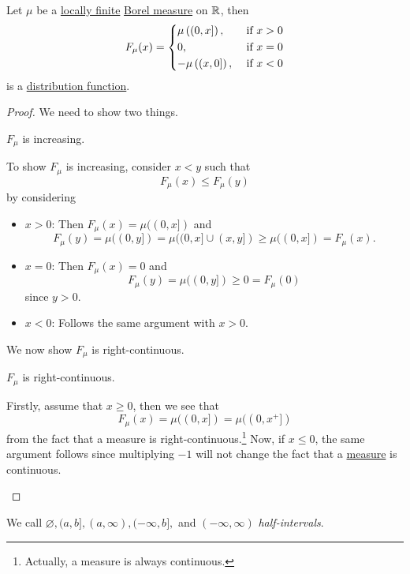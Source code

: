 \begin{lemma}
	Let \(\mu \) be a \hyperref[def:locally-finite]{locally finite} \hyperref[def:Borel-measure]{Borel measure} on
	\(\mathbb{\MakeUppercase{R}} \), then
	\[
		F_{\mu }(x) = \begin{dcases}
			\mu \left((0, x]\right),  & \text{ if } x > 0 \\
			0,                        & \text{ if } x = 0 \\
			-\mu \left((x, 0]\right), & \text{ if } x < 0
		\end{dcases}
	\]
	is a \hyperref[def:distribution-function]{distribution function}.
\end{lemma}
\begin{proof}
	We need to show two things.
	\begin{claim}
		\(F_\mu\) is increasing.
	\end{claim}
	\begin{explanation}
		To show \(F_\mu\) is increasing, consider \(x<y\) such that
		\[
			F_\mu (x) \leq F_\mu (y)
		\]
		by considering
		\begin{itemize}
			\item \(x>0\): Then \(F_\mu (x) = \mu ((0, x])\) and
			      \[
				      F_\mu (y) = \mu ((0, y]) = \mu ((0, x]\cup (x, y]) \geq \mu ((0, x]) = F_\mu (x).
			      \]
			\item \(x=0\): Then \(F_\mu (x) = 0\) and
			      \[
				      F_\mu (y) = \mu ((0, y])\geq 0 = F_\mu (0)
			      \]
			      since \(y>0\).
			\item \(x<0\): Follows the same argument with \(x>0\).
		\end{itemize}
	\end{explanation}

	We now show \(F_\mu \) is right-continuous.
	\begin{claim}
		\(F_\mu \) is right-continuous.
	\end{claim}
	\begin{explanation}
		Firstly, assume that \(x \geq 0\), then we see that
		\[
			F_\mu(x) = \mu ((0, x]) = \mu ((0, x^+])
		\]
		from the fact that a measure is right-continuous.\footnote{Actually, a measure is always continuous.} Now, if \(x\leq 0\),
		the same argument follows since multiplying \(-1\) will not change the fact that a \hyperref[def:measure]{measure} is continuous.
	\end{explanation}
\end{proof}

\begin{definition}\label{def:half-intervals}
	We call \(\varnothing , (a, b], (a, \infty ), (-\infty , b],\) and \((-\infty , \infty )\) \emph{half-intervals}.
\end{definition}

